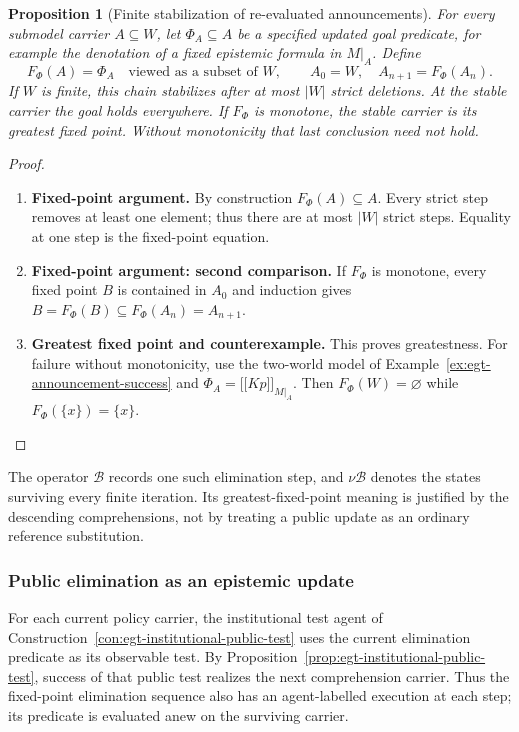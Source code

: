 \documentclass[11pt,a4paper]{article}
\numberwithin{equation}{section}
\newtheorem{proposition}[theorem]{Proposition}
\theoremstyle{definition}
\theoremstyle{remark}
\theoremstyle{plain}
\providecommand{\llbracket}{\mathopen{[\![}}
\providecommand{\rrbracket}{\mathclose{]\!]}}
\begin{document}
\begin{proposition}[Finite stabilization of re-evaluated announcements]
\label{prop:egt-announcement-stabilization}
For every submodel carrier $A\subseteq W$, let $\Phi_A\subseteq A$
be a specified updated goal predicate, for example the denotation of a fixed
epistemic formula in $M|_A$. Define
\[
 F_\Phi(A)=\Phi_A\quad\text{viewed as a subset of }W,
 \qquad A_0=W,\quad A_{n+1}=F_\Phi(A_n).
\]
If $W$ is finite, this chain stabilizes after at most $|W|$ strict deletions.
At the stable carrier the goal holds everywhere. If $F_\Phi$ is monotone,
the stable carrier is its greatest fixed point. Without monotonicity that
last conclusion need not hold.
\end{proposition}
\begin{proof}
\leavevmode
\begin{enumerate}[label=\textup{(\arabic*)},leftmargin=*,itemsep=4pt,topsep=3pt]
  \item \textbf{Fixed-point argument.} By construction $F_\Phi(A)\subseteq A$. Every strict step removes at
least one element; thus there are at most $|W|$ strict steps. Equality
at one step is the fixed-point equation.
  \item \textbf{Fixed-point argument: second comparison.} If $F_\Phi$ is monotone,
every fixed point $B$ is contained in $A_0$ and induction gives
$B=F_\Phi(B)\subseteq F_\Phi(A_n)=A_{n+1}$.
  \item \textbf{Greatest fixed point and counterexample.} This proves greatestness. For failure without monotonicity, use the two-world model of Example~\ref{ex:egt-announcement-success} and
$\Phi_A=\llbracket Kp\rrbracket_{M|_A}$. Then
$F_\Phi(W)=\varnothing$ while $F_\Phi(\{x\})=\{x\}$.
\end{enumerate}
\end{proof}

The operator $\mathcal B$ records one such elimination step, and
$\nu\mathcal B$ denotes the states surviving every finite iteration.
Its greatest-fixed-point meaning is justified by the descending
comprehensions, not by treating a public update as an ordinary
reference substitution.

\subsubsection{Public elimination as an epistemic update}

For each current policy carrier, the institutional test agent of
Construction~\ref{con:egt-institutional-public-test} uses the current
elimination predicate as its observable test. By
Proposition~\ref{prop:egt-institutional-public-test}, success of that
public test realizes the next comprehension carrier. Thus the
fixed-point elimination sequence also has an agent-labelled execution
at each step; its predicate is evaluated anew on the surviving carrier.
\end{document}

